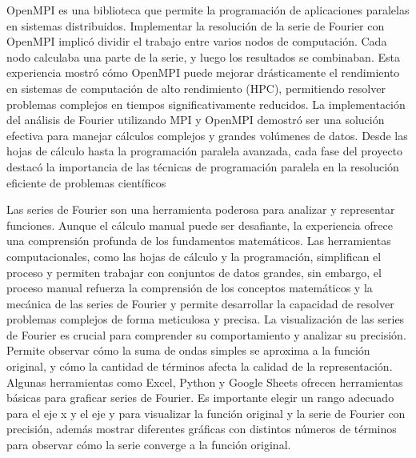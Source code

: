 
OpenMPI es una biblioteca que permite la programación de aplicaciones paralelas en sistemas distribuidos. Implementar la resolución de la serie de Fourier con OpenMPI implicó dividir el trabajo entre varios nodos de computación. Cada nodo calculaba una parte de la serie, y luego los resultados se combinaban. Esta experiencia mostró cómo OpenMPI puede mejorar drásticamente el rendimiento en sistemas de computación de alto rendimiento (HPC), permitiendo resolver problemas complejos en tiempos significativamente reducidos.
La implementación del análisis de Fourier utilizando MPI y OpenMPI demostró ser una solución efectiva para manejar cálculos complejos y grandes volúmenes de datos. Desde las hojas de cálculo hasta la programación paralela avanzada, cada fase del proyecto destacó la importancia de las técnicas de programación paralela en la resolución eficiente de problemas científicos


Las series de Fourier son una herramienta poderosa para analizar y representar funciones. Aunque el cálculo manual puede ser desafiante, la experiencia ofrece una comprensión profunda de los fundamentos matemáticos. Las herramientas computacionales, como las hojas de cálculo y la programación, simplifican el proceso y permiten trabajar con conjuntos de datos grandes, sin embargo, el proceso manual refuerza la comprensión de los conceptos matemáticos y la mecánica de las series de Fourier y permite desarrollar la capacidad de resolver problemas complejos de forma meticulosa y precisa. La visualización de las series de Fourier es crucial para comprender su comportamiento y analizar su precisión. Permite observar cómo la suma de ondas simples se aproxima a la función original, y cómo la cantidad de términos afecta la calidad de la representación. Algunas herramientas como Excel, Python y Google Sheets ofrecen herramientas básicas para graficar series de Fourier. Es importante elegir un rango adecuado para el eje x y el eje y para visualizar la función original y la serie de Fourier con precisión, además mostrar diferentes gráficas con distintos números de términos para observar cómo la serie converge a la función original.

